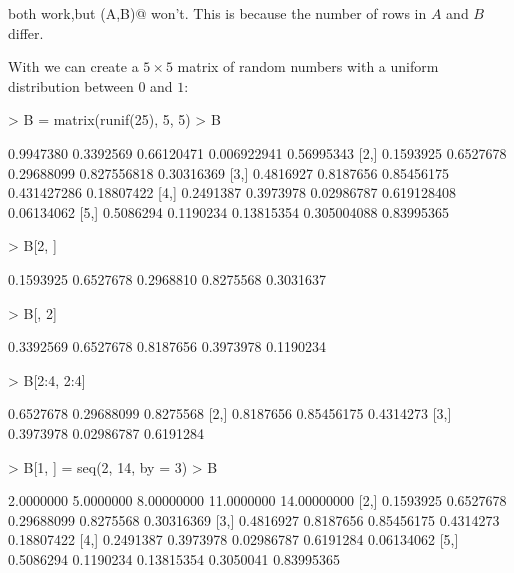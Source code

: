 \documentclass[11pt, oneside, reqno]{article}
\begin{document}
both work,but \verb@cbind(A,B)@ won't. This is because the number of rows in $A$ and $B$ differ. 

\eans

With \verb@runif@ we can create a $5\times 5$ matrix of random numbers with a uniform distribution between $0$ and $1$:

\begin{Schunk}
\begin{Sinput}
> B = matrix(runif(25), 5, 5)
> B
\end{Sinput}
\begin{Soutput}
          [,1]      [,2]       [,3]        [,4]       [,5]
[1,] 0.9947380 0.3392569 0.66120471 0.006922941 0.56995343
[2,] 0.1593925 0.6527678 0.29688099 0.827556818 0.30316369
[3,] 0.4816927 0.8187656 0.85456175 0.431427286 0.18807422
[4,] 0.2491387 0.3973978 0.02986787 0.619128408 0.06134062
[5,] 0.5086294 0.1190234 0.13815354 0.305004088 0.83995365
\end{Soutput}
\begin{Sinput}
> B[2, ]
\end{Sinput}
\begin{Soutput}
[1] 0.1593925 0.6527678 0.2968810 0.8275568 0.3031637
\end{Soutput}
\begin{Sinput}
> B[, 2]
\end{Sinput}
\begin{Soutput}
[1] 0.3392569 0.6527678 0.8187656 0.3973978 0.1190234
\end{Soutput}
\begin{Sinput}
> B[2:4, 2:4]
\end{Sinput}
\begin{Soutput}
          [,1]       [,2]      [,3]
[1,] 0.6527678 0.29688099 0.8275568
[2,] 0.8187656 0.85456175 0.4314273
[3,] 0.3973978 0.02986787 0.6191284
\end{Soutput}
\begin{Sinput}
> B[1, ] = seq(2, 14, by = 3)
> B
\end{Sinput}
\begin{Soutput}
          [,1]      [,2]       [,3]       [,4]        [,5]
[1,] 2.0000000 5.0000000 8.00000000 11.0000000 14.00000000
[2,] 0.1593925 0.6527678 0.29688099  0.8275568  0.30316369
[3,] 0.4816927 0.8187656 0.85456175  0.4314273  0.18807422
[4,] 0.2491387 0.3973978 0.02986787  0.6191284  0.06134062
[5,] 0.5086294 0.1190234 0.13815354  0.3050041  0.83995365
\end{Soutput}
\end{Schunk}
\end{document}
